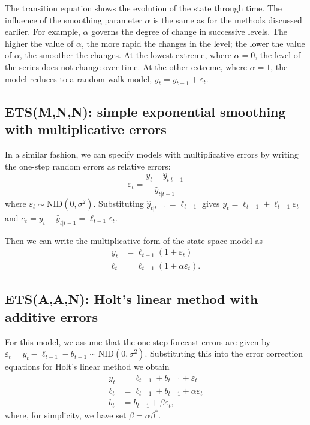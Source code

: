 \documentclass[]{book}
\begin{document}
The transition equation shows the evolution of the state through time. The influence of the smoothing parameter \(\alpha\) is the same as for the methods discussed earlier. For example, \(\alpha\) governs the degree of change in successive levels. The higher the value of \(\alpha\), the more rapid the changes in the level; the lower the value of \(\alpha\), the smoother the changes. At the lowest extreme, where \(\alpha=0\), the level of the series does not change over time. At the other extreme, where \(\alpha=1\), the model reduces to a random walk model, \(y_t=y_{t-1}+\varepsilon_t\).

\hypertarget{etsmnn-simple-exponential-smoothing-with-multiplicative-errors}{%
\subsection*{ETS(M,N,N): simple exponential smoothing with multiplicative errors}\label{etsmnn-simple-exponential-smoothing-with-multiplicative-errors}}

In a similar fashion, we can specify models with multiplicative errors by writing the one-step random errors as relative errors:
\[
  \varepsilon_t = \frac{y_t-\hat{y}_{t|t-1}}{\hat{y}_{t|t-1}}
\]
where \(\varepsilon_t \sim \text{NID}(0,\sigma^2)\). Substituting \(\hat{y}_{t|t-1}=\ell_{t-1}\) gives \(y_t = \ell_{t-1}+\ell_{t-1}\varepsilon_t\) and \(e_t = y_t - \hat{y}_{t|t-1} = \ell_{t-1}\varepsilon_t\).

Then we can write the multiplicative form of the state space model as
\begin{align*}
  y_t&=\ell_{t-1}(1+\varepsilon_t)\\
  \ell_t&=\ell_{t-1}(1+\alpha \varepsilon_t).
\end{align*}

\hypertarget{etsaan-holts-linear-method-with-additive-errors}{%
\subsection*{ETS(A,A,N): Holt's linear method with additive errors}\label{etsaan-holts-linear-method-with-additive-errors}}

For this model, we assume that the one-step forecast errors are given by \(\varepsilon_t=y_t-\ell_{t-1}-b_{t-1} \sim \text{NID}(0,\sigma^2)\). Substituting this into the error correction equations for Holt's linear method we obtain
\begin{align*}
y_t&=\ell_{t-1}+b_{t-1}+\varepsilon_t\\
\ell_t&=\ell_{t-1}+b_{t-1}+\alpha \varepsilon_t\\
b_t&=b_{t-1}+\beta \varepsilon_t,
\end{align*}
where, for simplicity, we have set \(\beta=\alpha \beta^*\).
\end{document}

